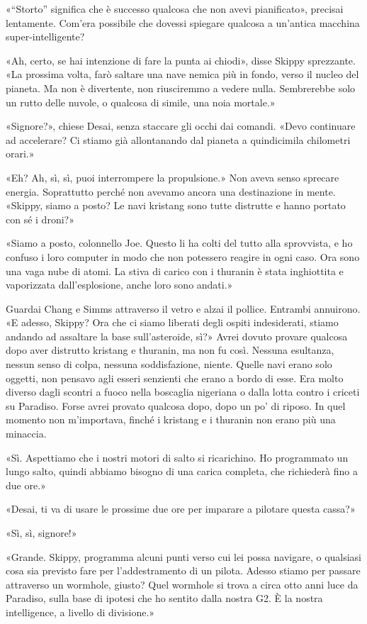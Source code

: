«``Storto'' significa che è successo qualcosa che non avevi
pianificato», precisai lentamente. Com'era possibile che dovessi
spiegare qualcosa a un'antica macchina super-intelligente?

«Ah, certo, se hai intenzione di fare la punta ai chiodi», disse Skippy
sprezzante. «La prossima volta, farò saltare una nave nemica più in
fondo, verso il nucleo del pianeta. Ma non è divertente, non riusciremmo
a vedere nulla. Sembrerebbe solo un rutto delle nuvole, o qualcosa di
simile, una noia mortale.»

«Signore?», chiese Desai, senza staccare gli occhi dai comandi. «Devo
continuare ad accelerare? Ci stiamo già allontanando dal pianeta a
quindicimila chilometri orari.»

«Eh? Ah, sì, sì, puoi interrompere la propulsione.» Non aveva senso
sprecare energia. Soprattutto perché non avevamo ancora una destinazione
in mente. «Skippy, siamo a posto? Le navi kristang sono tutte distrutte
e hanno portato con sé i droni?»

«Siamo a posto, colonnello Joe. Questo li ha colti del tutto alla
sprovvista, e ho confuso i loro computer in modo che non potessero
reagire in ogni caso. Ora sono una vaga nube di atomi. La stiva di
carico con i thuranin è stata inghiottita e vaporizzata dall'esplosione,
anche loro sono andati.»

Guardai Chang e Simms attraverso il vetro e alzai il pollice. Entrambi
annuirono. «E adesso, Skippy? Ora che ci siamo liberati degli ospiti
indesiderati, stiamo andando ad assaltare la base sull'asteroide, sì?»
Avrei dovuto provare qualcosa dopo aver distrutto kristang e thuranin,
ma non fu così. Nessuna esultanza, nessun senso di colpa, nessuna
soddisfazione, niente. Quelle navi erano solo oggetti, non pensavo agli
esseri senzienti che erano a bordo di esse. Era molto diverso dagli
scontri a fuoco nella boscaglia nigeriana o dalla lotta contro i criceti
su Paradiso. Forse avrei provato qualcosa dopo, dopo un po' di riposo.
In quel momento non m'importava, finché i kristang e i thuranin non
erano più una minaccia.

«Sì. Aspettiamo che i nostri motori di salto si ricarichino. Ho
programmato un lungo salto, quindi abbiamo bisogno di una carica
completa, che richiederà fino a due ore.»

«Desai, ti va di usare le prossime due ore per imparare a pilotare
questa cassa?»

«Sì, sì, signore!»

«Grande. Skippy, programma alcuni punti verso cui lei possa navigare, o
qualsiasi cosa sia previsto fare per l'addestramento di un pilota.
Adesso stiamo per passare attraverso un wormhole, giusto? Quel wormhole
si trova a circa otto anni luce da Paradiso, sulla base di ipotesi che
ho sentito dalla nostra G2. È la nostra intelligence, a livello di
divisione.»

